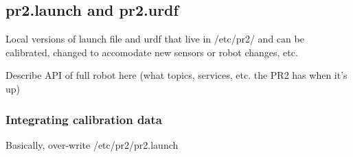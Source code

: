 \subsection{pr2.launch and pr2.urdf}
Local versions of launch file and urdf that live in /etc/pr2/ and can be calibrated, changed to accomodate new sensors or robot changes, etc.

Describe API of full robot here (what topics, services, etc. the PR2 has when it's up)
\subsubsection{Integrating calibration data}
Basically, over-write /etc/pr2/pr2.launch
